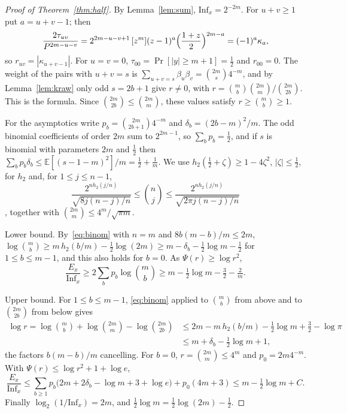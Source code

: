 \documentclass[11pt]{amsart}
\theoremstyle{remark}
\newcommand{\Inf}{\mathrm{Inf}}
\newcommand{\E}{\mathbb{E}}
\begin{document}
\begin{proof}[Proof of Theorem~\ref{thm:half}]
By Lemma~\ref{lem:sum}, $\Inf_x=2^{-2m}$. For $u+v\ge1$ put $a=u+v-1$; then
\[
\frac{2\tau_{uv}}{P^{2m-u-v}}=2^{2m-u-v+1}\,[z^m](z-1)^a\Bigl(\frac{1+z}2\Bigr)^{2m-a}=(-1)^a\kappa_a ,
\]
so $r_{uv}=|\kappa_{u+v-1}|$. For $u=v=0$, $\tau_{00}=\Pr[|y|\ge m+1]=\frac12$ and $r_{00}=0$. The weight of the pairs
with $u+v=s$ is $\sum_{u+v=s}\beta_u\beta_v=\binom{2m}s4^{-m}$, and by Lemma~\ref{lem:kraw} only odd $s=2b+1$ give
$r\ne0$, with $r=\binom mb\binom{2m}m/\binom{2m}{2b}$. This is the formula. Since $\binom{2m}{2b}\le\binom{2m}m$, these
values satisfy $r\ge\binom mb\ge1$.

For the asymptotics write $p_b=\binom{2m}{2b+1}4^{-m}$ and $\delta_b=(2b-m)^2/m$. The odd binomial coefficients of
order $2m$ sum to $2^{2m-1}$, so $\sum_bp_b=\frac12$, and if $s$ is binomial with parameters $2m$ and $\frac12$ then
$\sum_bp_b\delta_b\le\E[(s-1-m)^2]/m=\frac12+\frac1m$. We use $h_2(\frac12+\zeta)\ge1-4\zeta^2$, $|\zeta|\le\frac12$, for $h_2$
and, for $1\le j\le n-1$,
\begin{equation}\label{eq:binom}
\frac{2^{nh_2(j/n)}}{\sqrt{8j(n-j)/n}}\le\binom nj\le\frac{2^{nh_2(j/n)}}{\sqrt{2\pi j(n-j)/n}}
\end{equation}
\cite[Chapter~10, Lemma~7]{MS77}, together with $\binom{2m}m\le4^m/\sqrt{\pi m}$.

Lower bound. By~\eqref{eq:binom} with $n=m$ and $8b(m-b)/m\le2m$, $\log\binom mb\ge m\,h_2(b/m)-\frac12\log(2m)\ge
m-\delta_b-\frac12\log m-\frac12$ for $1\le b\le m-1$, and this also holds for $b=0$. As $\Psi(r)\ge\log r^2$,
\[
\frac{E_x}{\Inf_x}\ge2\sum_bp_b\log\binom mb\ge m-\tfrac12\log m-\tfrac32-\tfrac2m .
\]

Upper bound. For $1\le b\le m-1$, \eqref{eq:binom} applied to $\binom mb$ from above and to $\binom{2m}{2b}$ from below
gives
\begin{align*}
\log r=\log\binom mb+\log\binom{2m}m-\log\binom{2m}{2b}
&\le 2m-m\,h_2(b/m)-\tfrac12\log m+\tfrac32-\log\pi\\
&\le m+\delta_b-\tfrac12\log m+1 ,
\end{align*}
the factors $b(m-b)/m$ cancelling. For $b=0$, $r=\binom{2m}m\le4^m$ and $p_0=2m4^{-m}$. With
$\Psi(r)\le\log r^2+1+\log e$,
\[
\frac{E_x}{\Inf_x}\le\sum_{b\ge1}p_b\bigl(2m+2\delta_b-\log m+3+\log e\bigr)+p_0(4m+3)
\le m-\tfrac12\log m+C .
\]
Finally $\log_2(1/\Inf_x)=2m$, and $\frac12\log m=\frac12\log(2m)-\frac12$.


\end{proof}
\end{document}
